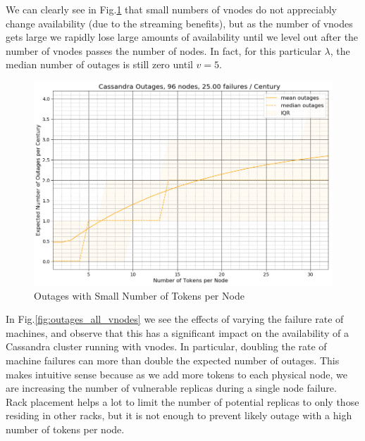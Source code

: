 \documentclass{article}
\begin{document}
We can clearly see in Fig.\ref{fig:outages_small_vnodes} that small numbers of
vnodes do not appreciably change availability (due to the streaming benefits),
but as the number of vnodes gets large we rapidly lose large amounts of
availability until we level out after the number of vnodes passes the number of
nodes. In fact, for this particular $\lambda$, the median number of outages is
still zero until $v=5$.

\begin{figure}[h!]
    \centering
    \includegraphics[width=1.0\textwidth]{images/outages_vnodes_small.png}
    \caption{Outages with Small Number of Tokens per Node}
    \label{fig:outages_small_vnodes}
\end{figure}

In Fig.\ref{fig:outages_all_vnodes} we see the effects of varying the failure
rate of machines, and observe that this has a significant impact on the
availability of a Cassandra cluster running with vnodes. In particular,
doubling the rate of machine failures can more than double the expected
number of outages. This makes intuitive sense because as we add more tokens
to each physical node, we are increasing the number of vulnerable replicas
during a single node failure. Rack placement helps a lot to limit the number
of potential replicas to only those residing in other racks, but it is not
enough to prevent likely outage with a high number of tokens per node.
\end{document}
